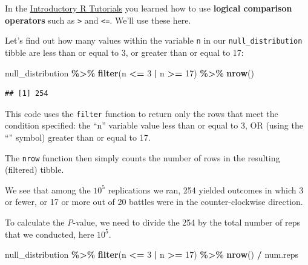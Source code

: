 \documentclass[
]{book}
\newenvironment{Shaded}{\begin{snugshade}}{\end{snugshade}}
\newcommand{\DecValTok}[1]{\textcolor[rgb]{0.00,0.00,0.81}{#1}}
\newcommand{\FunctionTok}[1]{\textcolor[rgb]{0.13,0.29,0.53}{\textbf{#1}}}
\newcommand{\NormalTok}[1]{#1}
\newcommand{\SpecialCharTok}[1]{\textcolor[rgb]{0.81,0.36,0.00}{\textbf{#1}}}
\begin{document}
In the \hyperref[coding_basics]{Introductory R Tutorials} you learned how to use \textbf{logical comparison operators} such as \texttt{\textgreater{}} and \texttt{\textless{}=}. We'll use these here.

Let's find out how many values within the variable \texttt{n} in our \texttt{null\_distribution} tibble are less than or equal to 3, or greater than or equal to 17:

\begin{Shaded}
\begin{Highlighting}[]
\NormalTok{null\_distribution }\SpecialCharTok{\%\textgreater{}\%}
  \FunctionTok{filter}\NormalTok{(n }\SpecialCharTok{\textless{}=} \DecValTok{3} \SpecialCharTok{|}\NormalTok{ n }\SpecialCharTok{\textgreater{}=} \DecValTok{17}\NormalTok{) }\SpecialCharTok{\%\textgreater{}\%}
  \FunctionTok{nrow}\NormalTok{() }
\end{Highlighting}
\end{Shaded}

\begin{verbatim}
## [1] 254
\end{verbatim}

This code uses the \texttt{filter} function to return only the rows that meet the condition specified: the ``n'' variable value less than or equal to 3, OR (using the ``\textbar{}'' symbol) greater than or equal to 17.

The \texttt{nrow} function then simply counts the number of rows in the resulting (filtered) tibble.

We see that among the \ensuremath{10^{5}} replications we ran, 254 yielded outcomes in which 3 or fewer, or 17 or more out of 20 battles were in the counter-clockwise direction.

To calculate the \emph{P}-value, we need to divide the 254 by the total number of reps that we conducted, here \ensuremath{10^{5}}.

\begin{Shaded}
\begin{Highlighting}[]
\NormalTok{null\_distribution }\SpecialCharTok{\%\textgreater{}\%}
  \FunctionTok{filter}\NormalTok{(n }\SpecialCharTok{\textless{}=} \DecValTok{3} \SpecialCharTok{|}\NormalTok{ n }\SpecialCharTok{\textgreater{}=} \DecValTok{17}\NormalTok{) }\SpecialCharTok{\%\textgreater{}\%}
  \FunctionTok{nrow}\NormalTok{() }\SpecialCharTok{/}\NormalTok{ num.reps}
\end{Highlighting}
\end{Shaded}
\end{document}
